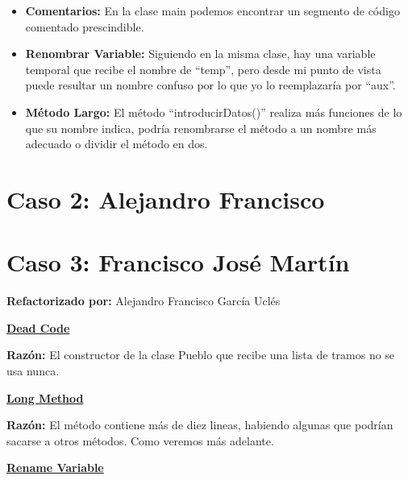 \documentclass[11pt,a4paper,oneside]{book}
\begin{document}
\begin{itemize}
    \item \textbf{Comentarios: } En la clase main podemos encontrar un segmento de código comentado prescindible.
    
    
     \item \textbf{Renombrar Variable: } Siguiendo en la misma clase, hay una variable temporal que recibe el nombre de ``temp'', pero desde mi punto de vista puede resultar un nombre confuso por lo que yo lo reemplazaría por ``aux''.
     
     
      \item \textbf{Método Largo: } El método ``introducirDatos()'' realiza más funciones de lo que su nombre indica, podría renombrarse el método a un nombre más adecuado o dividir el método en dos.
          
  
\end{itemize}

\chapter{Caso 2: Alejandro Francisco}

\chapter {Caso 3: Francisco José Martín}
 \textbf{Refactorizado por:} Alejandro Francisco García Uclés \newline

    \hyperref[DeadCode]{\textbf{Dead Code}}
    
    \textbf{Razón:} El constructor de la clase Pueblo que recibe una lista de tramos no se usa nunca.
    
    
    
    \hyperref[LongMethod]{\textbf{Long Method}}
    
    \textbf{Razón:} El método contiene más de diez lineas, habiendo algunas que podrían sacarse a otros métodos. Como veremos más adelante.
    
    
    
    \hyperref[RenameVariable]{\textbf{Rename Variable}}
    
\end{document}
